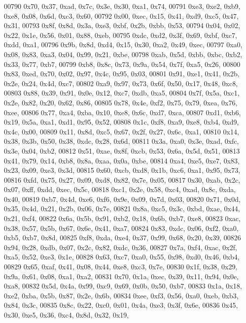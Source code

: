 \begin{DoxyCode}
00790   0x70, 0x37, 0xad, 0x7c, 0x3e, 0x30, 0xa1, 0x74,
00791   0xe3, 0xe2, 0xb9, 0xe8, 0x08, 0x6d, 0xc3, 0x60,
00792   0x00, 0xec, 0x15, 0x41, 0xd9, 0xc5, 0x47, 0x31,
00793   0x8f, 0x8d, 0x3a, 0xe3, 0xbf, 0x2b, 0xbb, 0x53,
00794   0x04, 0x02, 0x22, 0x1e, 0x56, 0x01, 0x88, 0xeb,
00795   0xdc, 0xd2, 0x3f, 0x69, 0xbf, 0xc7, 0xdd, 0xa1,
00796   0x9b, 0x8d, 0xd4, 0x15, 0x30, 0xa2, 0x49, 0xec,
00797   0xa0, 0x08, 0x83, 0xa3, 0x04, 0x99, 0x21, 0xbe,
00798   0xab, 0x5d, 0xbb, 0xbc, 0xb2, 0x33, 0x77, 0xb7,
00799   0xb8, 0x8c, 0x73, 0x9a, 0x54, 0x7f, 0xa5, 0x26,
00800   0x83, 0xed, 0x70, 0x02, 0x97, 0x4c, 0x95, 0x03,
00801   0x91, 0xe1, 0x41, 0x2b, 0x2e, 0x24, 0x4d, 0xc7,
00802   0xa9, 0x97, 0x73, 0x6f, 0x50, 0x17, 0x48, 0xc8,
00803   0x88, 0x39, 0x91, 0x0e, 0x12, 0xc7, 0xdb, 0xa5,
00804   0x7f, 0x5a, 0xc1, 0x2e, 0x82, 0x20, 0x62, 0x86,
00805   0x78, 0x4e, 0xf2, 0x75, 0x79, 0xea, 0x76, 0xee,
00806   0x77, 0xa4, 0xba, 0x10, 0xe8, 0x6c, 0xd7, 0xca,
00807   0xd1, 0xb6, 0x19, 0x5a, 0xa1, 0xd1, 0x95, 0x52,
00808   0x1c, 0xf8, 0xa9, 0xe8, 0xb4, 0xd9, 0x4c, 0x00,
00809   0x11, 0x8d, 0xc5, 0x67, 0x2f, 0x27, 0x6c, 0xa1,
00810   0x14, 0x38, 0x3b, 0x50, 0x38, 0xdc, 0x28, 0x6d,
00811   0x3a, 0xa0, 0x3e, 0xad, 0xfc, 0x3e, 0x04, 0xb2,
00812   0x51, 0xae, 0x8f, 0xcb, 0x53, 0x6a, 0x5d, 0x51,
00813   0x41, 0x79, 0x14, 0xb8, 0x8a, 0xaa, 0x0a, 0xbe,
00814   0xa4, 0xe5, 0xe7, 0x83, 0x23, 0x09, 0xe3, 0x3d,
00815   0x60, 0xcb, 0xd8, 0x1b, 0xc6, 0xa1, 0x95, 0x73,
00816   0xfd, 0x75, 0x27, 0x09, 0xd8, 0x82, 0x7e, 0x05,
00817   0x30, 0xab, 0x2c, 0x07, 0xff, 0xdd, 0xec, 0x5c,
00818   0xc1, 0x2e, 0x58, 0xc4, 0xad, 0x8c, 0xda, 0x40,
00819   0xb7, 0x4d, 0xe6, 0xf6, 0x9e, 0x09, 0x7d, 0x03,
00820   0x71, 0x0d, 0x35, 0x4d, 0x21, 0x2b, 0x06, 0x7e,
00821   0x8a, 0xc5, 0x3c, 0xbd, 0xae, 0x44, 0x21, 0xf4,
00822   0x6a, 0x5b, 0x91, 0xb2, 0x18, 0x6b, 0xb7, 0xe8,
00823   0xac, 0x38, 0x57, 0x5b, 0x67, 0x6e, 0x41, 0xa7,
00824   0x83, 0xdc, 0x06, 0xf2, 0xa0, 0xb5, 0xb7, 0x8d,
00825   0xf8, 0xda, 0xe4, 0x37, 0x99, 0x68, 0x20, 0x39,
00826   0x94, 0x28, 0xdb, 0x07, 0x2c, 0x82, 0xdc, 0x36,
00827   0x7a, 0xf4, 0xac, 0x2f, 0xa5, 0x52, 0xe3, 0x1e,
00828   0x63, 0xc7, 0xa0, 0x55, 0x98, 0xd0, 0x46, 0xb4,
00829   0x65, 0xaf, 0x41, 0x08, 0x44, 0xe8, 0xc3, 0x7e,
00830   0x1f, 0x38, 0x29, 0x9a, 0x61, 0x08, 0xa1, 0xa2,
00831   0x70, 0x1a, 0xec, 0x39, 0x11, 0x94, 0x0e, 0xa8,
00832   0x5d, 0x4a, 0x99, 0xc9, 0x69, 0x0b, 0x50, 0xb7,
00833   0x1a, 0x18, 0xe2, 0xba, 0x5b, 0x87, 0x2e, 0x6b,
00834   0xee, 0xf3, 0x56, 0xa0, 0xeb, 0xb3, 0x84, 0x3c,
00835   0x8c, 0x22, 0xc0, 0x01, 0x4a, 0xe3, 0x3f, 0x6e,
00836   0x45, 0x30, 0xe5, 0x36, 0xc4, 0x8d, 0x32, 0x19,

\end{DoxyCode}
